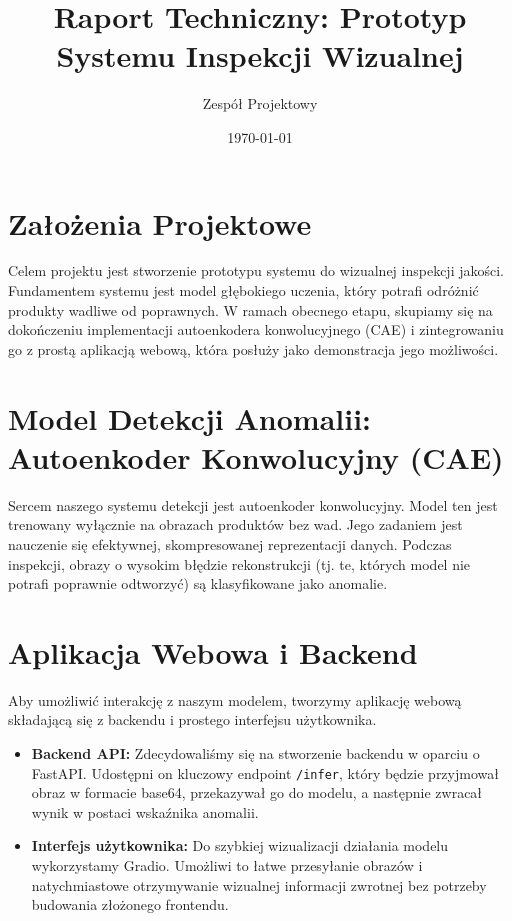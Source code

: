 \documentclass{article}
\title{Raport Techniczny: Prototyp Systemu Inspekcji Wizualnej}
\author{Zespół Projektowy}
\date{\today}
\begin{document}
\maketitle

\section{Założenia Projektowe}
Celem projektu jest stworzenie prototypu systemu do wizualnej inspekcji jakości. Fundamentem systemu jest model głębokiego uczenia, który potrafi odróżnić produkty wadliwe od poprawnych. W ramach obecnego etapu, skupiamy się na dokończeniu implementacji autoenkodera konwolucyjnego (CAE) i zintegrowaniu go z prostą aplikacją webową, która posłuży jako demonstracja jego możliwości.

\section{Model Detekcji Anomalii: Autoenkoder Konwolucyjny (CAE)}
Sercem naszego systemu detekcji jest autoenkoder konwolucyjny. Model ten jest trenowany wyłącznie na obrazach produktów bez wad. Jego zadaniem jest nauczenie się efektywnej, skompresowanej reprezentacji danych. Podczas inspekcji, obrazy o wysokim błędzie rekonstrukcji (tj. te, których model nie potrafi poprawnie odtworzyć) są klasyfikowane jako anomalie.

\section{Aplikacja Webowa i Backend}
Aby umożliwić interakcję z naszym modelem, tworzymy aplikację webową składającą się z backendu i prostego interfejsu użytkownika.
\begin{itemize}
    \item \textbf{Backend API:} Zdecydowaliśmy się na stworzenie backendu w oparciu o FastAPI. Udostępni on kluczowy endpoint \texttt{/infer}, który będzie przyjmował obraz w formacie base64, przekazywał go do modelu, a następnie zwracał wynik w postaci wskaźnika anomalii.
    \item \textbf{Interfejs użytkownika:} Do szybkiej wizualizacji działania modelu wykorzystamy Gradio. Umożliwi to łatwe przesyłanie obrazów i natychmiastowe otrzymywanie wizualnej informacji zwrotnej bez potrzeby budowania złożonego frontendu.
\end{itemize}
\end{document}
